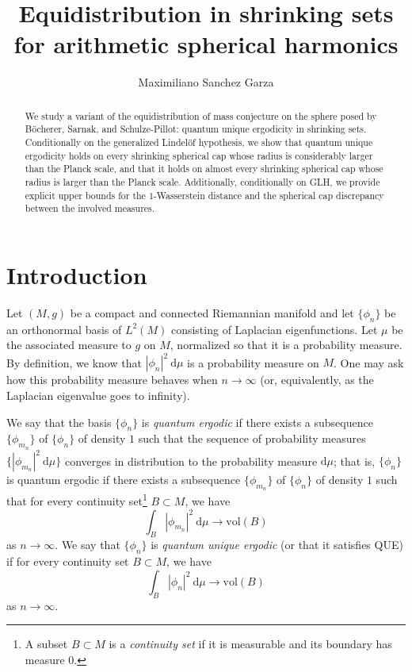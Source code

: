 \documentclass[11pt]{amsart}
\theoremstyle{definition}
\begin{document}
\title{Equidistribution in shrinking sets for arithmetic spherical harmonics}
\author{Maximiliano Sanchez Garza}
\date{}

\begin{abstract}
We study a variant of the equidistribution of mass conjecture on the sphere posed by Böcherer, Sarnak, and Schulze-Pillot: quantum unique ergodicity in shrinking sets. Conditionally on the generalized Lindelöf hypothesis, we show that quantum unique ergodicity holds on every shrinking spherical cap whose radius is considerably larger than the Planck scale, and that it holds on almost every shrinking spherical cap whose radius is larger than the Planck scale. Additionally, conditionally on GLH, we provide explicit upper bounds for the $1$-Wasserstein distance and the spherical cap discrepancy between the involved measures.
\end{abstract}

\maketitle









\section{Introduction}\label{Introduction}

Let $(M,g)$ be a compact and connected Riemannian manifold and let $\{\phi_n\}$ be an orthonormal basis of $L^2(M)$ consisting of Laplacian eigenfunctions. Let $\mu$ be the associated measure to $g$ on $M$, normalized so that it is a probability measure. By definition, we know that $|\phi_n|^2 \: \mathrm{d}\mu$ is a probability measure on $M$. One may ask how this probability measure behaves when $n\rightarrow \infty$ (or, equivalently, as the Laplacian eigenvalue goes to infinity).

We say that the basis $\{\phi_n\}$ is \textit{quantum ergodic} if there exists a subsequence $\{\phi_{m_n}\}$ of $\{\phi_n\}$ of density $1$ such that the sequence of probability measures $\{|\phi_{m_n}|^2 \: \mathrm{d}\mu\}$ converges in distribution to the probability measure $\mathrm{d}\mu$; that is, $\{\phi_n\}$ is quantum ergodic if there exists a subsequence $\{\phi_{m_n}\}$ of $\{\phi_n\}$ of density $1$ such that for every continuity set\footnote{A subset $B\subset M$ is a \textit{continuity set} if it is measurable and its boundary has measure $0$.} $B\subset M$, we have $$ \int_{B} |\phi_{m_n}|^2 \: \mathrm{d}\mu \longrightarrow \mathrm{vol}(B)$$ as $n\rightarrow \infty$. We say that $\{\phi_n\}$ is \textit{quantum unique ergodic} (or that it satisfies QUE) if for every continuity set $B\subset M$, we have 
\begin{equation}
    \int_{B} |\phi_{n}|^2 \: \mathrm{d}\mu \longrightarrow \mathrm{vol}(B) \label{QUEDef}
\end{equation}
as $n\rightarrow \infty$.
\end{document}
